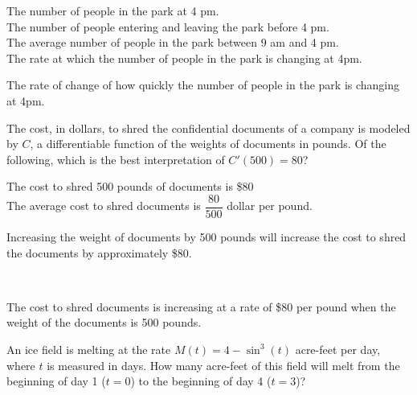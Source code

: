 \begin{questions}
    \begin{oneparchoices}
        \choice The number of people in the park at 4 pm. \\[11pt]
        \makebox[0.035\textwidth] \choice The number of people entering and leaving the park before 4 pm. \\[11pt]
        \makebox[0.035\textwidth] \choice The average number of people in the park between 9 am and 4 pm. \\[11pt]
        \makebox[0.035\textwidth] \choice The rate at which the number of people in the park is changing at 4pm. \\[11pt]
        \makebox[0.035\textwidth] \choice \parbox[t]{\dimexpr\linewidth-2\labelwidth-2\itemindent}{\raggedright The rate of change of how quickly the number of people in the park is changing at 4pm.}
    \end{oneparchoices} \par \horizontalline

    \question The cost, in dollars, to shred the confidential documents of a company is modeled by $C$, a differentiable function of the weights of documents in pounds. Of the following, which is the best interpretation of $C'(500) = 80$? \\

    \begin{oneparchoices}
        \choice The cost to shred 500 pounds of documents is \$80 \\[11pt]
        \makebox[0.035\textwidth] \choice The average cost to shred documents is $\dfrac{80}{500}$ dollar per pound. \\[11pt]
        \makebox[0.035\textwidth] \choice \parbox[t]{\dimexpr\linewidth-2\labelwidth-2\itemindent}{\raggedright Increasing the weight of documents by 500 pounds will increase the cost to shred the documents by approximately \$80.} \\[11pt]
        \makebox[0.035\textwidth] \choice \parbox[t]{\dimexpr\linewidth-2\labelwidth-2\itemindent}{\raggedright The cost to shred documents is increasing at a rate of \$80 per pound when the weight of the documents is 500 pounds.}
    \end{oneparchoices} \par \horizontalline

    \question An ice field is melting at the rate $M(t) = 4 - \sin^3 (t)$ acre-feet per day, where $t$ is measured in days. How many acre-feet of this field will melt from the beginning of day 1 ($t = 0$) to the beginning of day 4 ($t = 3$)? \\


\end{questions}

